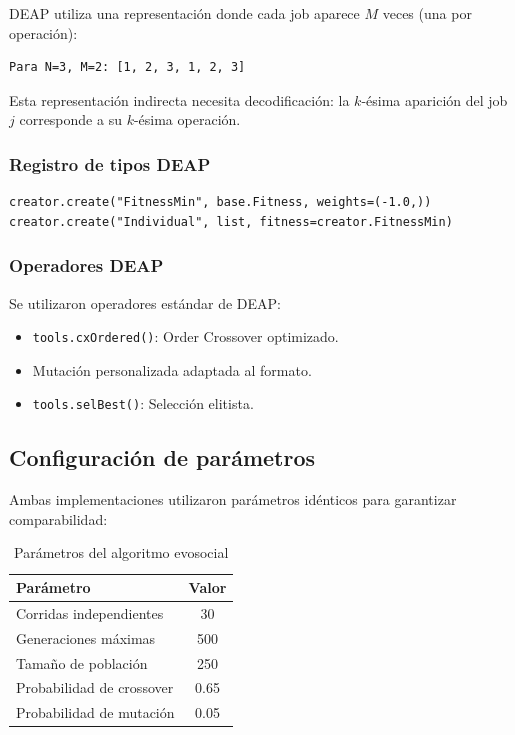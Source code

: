 \documentclass[12pt,a4paper]{article}
\begin{document}
DEAP utiliza una representación donde cada job aparece $M$ veces (una por operación):
\begin{verbatim}
Para N=3, M=2: [1, 2, 3, 1, 2, 3]
\end{verbatim}

Esta representación indirecta necesita decodificación: la $k$-ésima aparición del job $j$ corresponde a su $k$-ésima operación.

\subsubsection{Registro de tipos DEAP}

\begin{verbatim}
creator.create("FitnessMin", base.Fitness, weights=(-1.0,))
creator.create("Individual", list, fitness=creator.FitnessMin)
\end{verbatim}

\subsubsection{Operadores DEAP}

Se utilizaron operadores estándar de DEAP:
\begin{itemize}
    \item \texttt{tools.cxOrdered()}: Order Crossover optimizado.
    \item Mutación personalizada adaptada al formato.
    \item \texttt{tools.selBest()}: Selección elitista.
\end{itemize}

\subsection{Configuración de parámetros}

Ambas implementaciones utilizaron parámetros idénticos para garantizar comparabilidad:

\begin{table}[H]
\centering
\caption{Parámetros del algoritmo evosocial}
\label{tab:parametros}
\begin{tabular}{@{}lc@{}}
\toprule
\textbf{Parámetro} & \textbf{Valor} \\ \midrule
Corridas independientes & 30 \\
Generaciones máximas & 500 \\
Tamaño de población & 250 \\
Probabilidad de crossover & 0.65 \\
Probabilidad de mutación & 0.05 \\
\bottomrule
\end{tabular}
\end{table}
\end{document}
